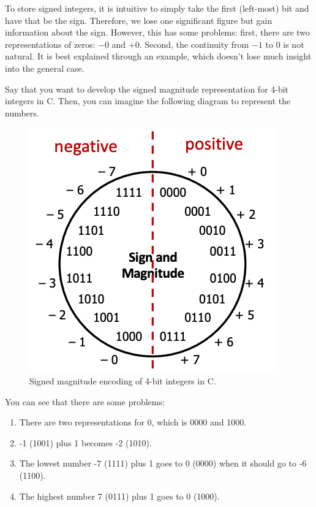   To store signed integers, it is intuitive to simply take the first (left-most) bit and have that be the sign. Therefore, we lose one significant figure but gain information about the sign. However, this has some problems: first, there are two representations of zeros: $-0$ and $+0$. Second, the continuity from $-1$ to $0$ is not natural. It is best explained through an example, which doesn't lose much insight into the general case. 

  \begin{example}
    Say that you want to develop the signed magnitude representation for 4-bit integers in C. Then, you can imagine the following diagram to represent the numbers. 
    \begin{figure}[H]
      \centering 
      \includegraphics[scale=0.4]{img/signed_magnitude_encoding.png}
      \caption{Signed magnitude encoding of 4-bit integers in C.} 
      \label{fig:signed_magnitude_encoding}
    \end{figure}
    You can see that there are some problems: 
    \begin{enumerate}
      \item There are two representations for $0$, which is 0000 and 1000. 
      \item -1 (1001) plus 1 becomes -2 (1010). 
      \item The lowest number -7 (1111) plus 1 goes to 0 (0000) when it should go to -6 (1100). 
      \item The highest number 7 (0111) plus 1 goes to 0 (1000). 
    \end{enumerate}
  \end{example}

